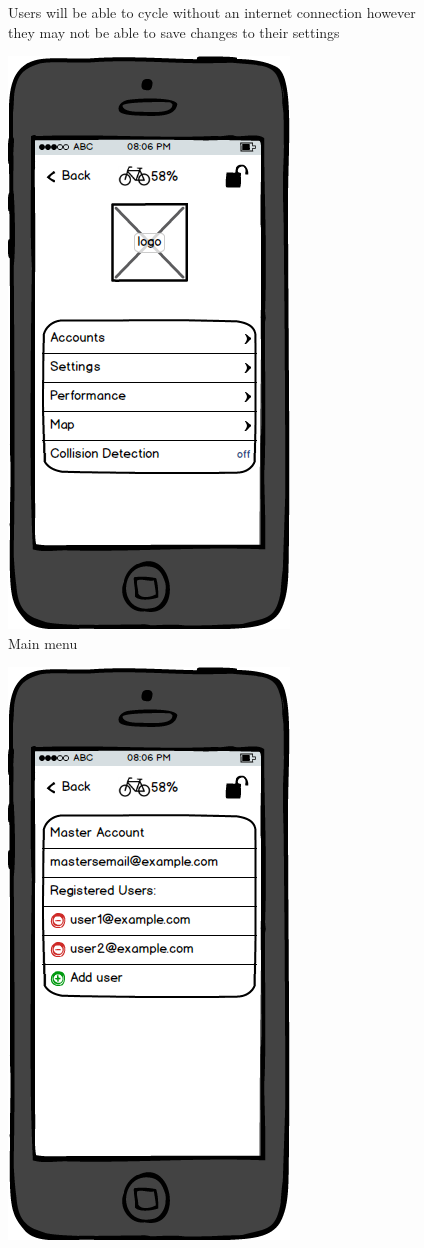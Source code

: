\documentclass[a4paper]{report}
\begin{document}
{\begin{figure}
\caption{Users will be able to cycle without an internet connection however they may not be able to save changes to their settings}
\end{figure}
\clearpage
\begin{figure}
\centering
\includegraphics[scale=0.9]{figures/prototype_2/main}
\caption{Main menu}
\end{figure}
\clearpage
\begin{figure}
\centering
\includegraphics[scale=0.9]{figures/prototype_2/accounts}

\end{figure}}
\end{document}

